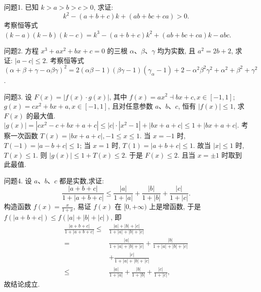 
问题1. 已知 $k>a>b>c>0$, 求证:
$$
k^2-(a+b+c) k+(a b+b c+c a)>0 .
$$
考察恒等式 $(k-a)(k-b)(k-c)=k^3-(a+b+c) k^2+(a b+b c+ c a) k-a b c$.



问题2. 方程 $x^3+a x^2+b x+c=0$ 的三根 $\alpha 、 \beta 、 \gamma$ 均为实数, 且 $a^2=2 b+2$, 求证: $|a-c| \leqslant 2$.
考察恒等式 $(\alpha+\beta+\gamma-\alpha \beta \gamma)^2=2(\alpha \beta-1)(\beta \gamma-1)\left(\gamma_\alpha-1\right)+2- \alpha^2 \beta^2 \gamma^2+\alpha^2+\beta^2+\gamma^2$.



问题3. 设 $F(x)=|f(x) \cdot g(x)|$, 其中 $f(x)=a x^2 \dashv b x+c, x \in[-1,1]$; $g(x)=c x^2+b x+a, x \in[-1,1]$, 且对任意参数 $a 、 b 、 c$, 恒有 $|f(x)| \leqslant 1$, 求 $F(x)$ 的最大值.
$|g(x)|=\left|c x^2-c+b x+a+c\right| \leqslant|c| \cdot\left|x^2-1\right|+|b x+a+c| \leqslant 1+|b x+a+c|$.
考察一次函数 $T(x)=|b x+a+c|,-1 \leqslant x \leqslant 1$.
当 $x=-1$ 时, $T(-1)=|a-b+c| \leqslant 1$; 当 $x=1$ 时, $T(1)=\mid a+b+ c \mid \leqslant 1$. 故当 $|x| \leqslant 1$ 时, $T(x) \leqslant 1$. 则 $|g(x)| \leqslant 1+T(x) \leqslant 2$. 于是 $F(x) \leqslant 2$. 且当 $x= \pm 1$ 时取到此最值.



问题4. 设 $a 、 b 、 c$ 都是实数,求证:
$$
\frac{|a+b+c|}{1+|a+b+c|} \leqslant \frac{|a|}{1+|a|}+\frac{|b|}{1+|b|}+\frac{|c|}{1+|c|} .
$$
构造函数 $f(x)=\frac{x}{1+x}$, 易证 $f(x)$ 在 $[0,+\infty)$ 上是增函数, 于是
$f(|a+b+c|) \leqslant f(|a|+|b|+|c|)$, 即
$$
\begin{aligned}
\frac{|a+b+c|}{1+|a+b+c|} \leqslant & \frac{|a|+|b|+|c|}{1+|a|+|b|+|c|} \\
= & \frac{|a|}{1+|a|+|b|+|c|}+\frac{|b|}{1+|a|+|b|+|c|} \\
& +\frac{|c|}{1+|a|+|b|+|c|} \\
\leqslant & \frac{|a|}{1+|a|}+\frac{|b|}{1+|b|}+\frac{|c|}{1+|c|},
\end{aligned}
$$
故结论成立.



